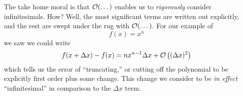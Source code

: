 The take home moral is that $\mathcal{O}(\dots)$ enables us to
\emph{rigorously} consider infinitesimals. How? Well, the most
significant terms are written out explicitly, and the rest are
swept under the rug with $\mathcal{O}(\dots)$. For our example of 
\begin{equation}
f(x)=x^{n}
\end{equation}
we saw we could write
\begin{equation}
f(x+\Delta x)-f(x)=nx^{n-1}\Delta x+\mathcal{O}\left((\Delta
x)^{2}\right)
\end{equation}
which tells us the error of ``truncating,'' or cutting off the
polynomial to be explicitly first order plus some change. This
change we consider to be \emph{in effect} ``infinitesimal'' in
comparison to the $\Delta x$ term.
